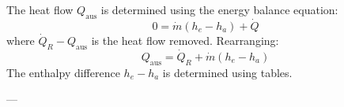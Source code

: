 The heat flow \( Q_{\text{aus}} \) is determined using the energy balance equation:  
\[
0 = \dot{m}(h_e - h_a) + \dot{Q}
\]  
where \( \dot{Q}_R - Q_{\text{aus}} \) is the heat flow removed. Rearranging:  
\[
Q_{\text{aus}} = \dot{Q}_R + \dot{m}(h_e - h_a)
\]  
The enthalpy difference \( h_e - h_a \) is determined using tables.

---